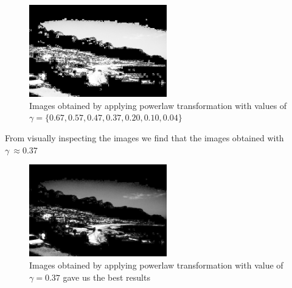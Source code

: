 \documentclass[paper=a4, fontsize=11pt]{scrartcl} %
\numberwithin{equation}{section} %
\numberwithin{figure}{section} %
\numberwithin{table}{section} %
\begin{document}
\begin{figure}[h!]
            \includegraphics[clip,height=4cm]{gamma04}
            \caption{Images obtained by applying powerlaw transformation with values of \(\gamma = \{0.67,0.57, 0.47,0.37,0.20,0.10,0.04\}\)}
        \end{figure}
        From visually inspecting the images we find that the images obtained with \(\gamma\ \approx 0.37\) 
        \begin{figure}[h!]
            \centering
            \includegraphics[clip,height=4cm]{gamma37}
            \caption{Images obtained by applying powerlaw transformation with value of \(\gamma = 0.37\) gave us the best results}
        \end{figure}
\end{document}
